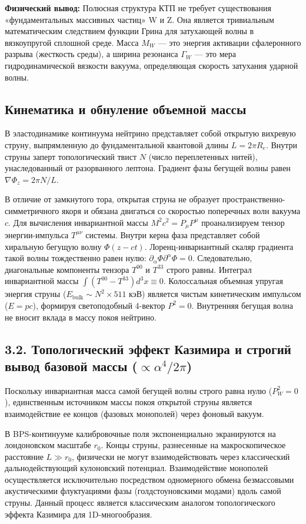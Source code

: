 \documentclass[11pt,a4paper]{article}
\begin{document}
	\textbf{Физический вывод:} Полюсная структура КТП не требует существования «фундаментальных массивных частиц» W и Z. Она является тривиальным математическим следствием функции Грина для затухающей волны в вязкоупругой сплошной среде. Масса $M_W$ — это энергия активации сфалеронного разрыва (жесткость среды), а ширина резонанса $\Gamma_W$ — это мера гидродинамической вязкости вакуума, определяющая скорость затухания ударной волны. 
	
	\subsection{Кинематика и обнуление объемной массы}
	В эластодинамике континуума нейтрино представляет собой открытую вихревую струну, выпрямленную до фундаментальной квантовой длины $L = 2\pi R_e$. Внутри струны заперт топологический твист $N$ (число переплетенных нитей), унаследованный от разорванного лептона. Градиент фазы бегущей волны равен $\nabla \Phi_z = 2\pi N / L$.
	
	В отличие от замкнутого тора, открытая струна не образует пространственно-симметричного якоря и обязана двигаться со скоростью поперечных волн вакуума $c$. Для вычисления инвариантной массы $M^2 c^2 = P_\mu P^\mu$ проанализируем тензор энергии-импульса $T^{\mu\nu}$ системы.
	Внутри керна фаза представляет собой хиральную бегущую волну $\Phi(z-ct)$. Лоренц-инвариантный скаляр градиента такой волны тождественно равен нулю: $\partial_\alpha \Phi \partial^\alpha \Phi = 0$. 
	Следовательно, диагональные компоненты тензора $T^{00}$ и $T^{33}$ строго равны. Интеграл инвариантной массы $\int (T^{00} - T^{33}) d^3x \equiv 0$. Колоссальная объемная упругая энергия струны ($E_{\text{bulk}} \sim N^2 \times 511$ кэВ) является чистым кинетическим импульсом ($E = pc$), формируя светоподобный 4-вектор $P^2 = 0$. Внутренняя бегущая волна не вносит вклада в массу покоя нейтрино.
	
	\subsection{3.2. Топологический эффект Казимира и строгий вывод базовой массы ($\propto \alpha^4 / 2\pi$)}
	Поскольку инвариантная масса самой бегущей волны строго равна нулю ($P_W^2 = 0$), единственным источником массы покоя открытой струны является взаимодействие ее концов (фазовых монополей) через фоновый вакуум. 
	
	В BPS-континууме калибровочные поля экспоненциально экранируются на лондоновском масштабе $r_0$. Концы струны, разнесенные на макроскопическое расстояние $L \gg r_0$, физически не могут взаимодействовать через классический дальнодействующий кулоновский потенциал. Взаимодействие монополей осуществляется исключительно посредством одномерного обмена безмассовыми акустическими флуктуациями фазы (голдстоуновскими модами) вдоль самой струны. Данный процесс является классическим аналогом топологического эффекта Казимира для 1D-многообразия.
	
\end{document}
